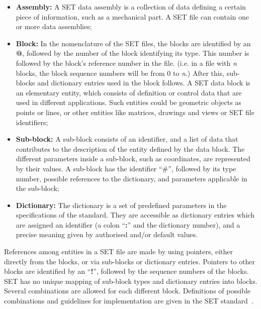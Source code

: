 \begin{itemize}
\item{\bf Assembly:} A SET data assembly is a collection of data defining
a certain piece of information, such as a mechanical part.
A SET file can contain one or more data assemblies;
 
\item{\bf Block:} In the nomenclature of the SET files,
the blocks are identified by an {\bf @},
followed by the number of the block identifying its type.
This number is followed by the block's reference number in the file.
(i.e. in a file with {\it n} blocks, the block sequence numbers will be from 0
 to {\it n}.)
After this, sub-blocks and dictionary entries used in the block follows.
A SET data block is an elementary entity, which consists of
definition or control data that are used in different applications.
Such entities could be geometric objects as points or lines, or other entities
like matrices, drawings and views or SET file identifiers;
 
 
\item{\bf Sub-block:} A sub-block consists of an identifier, and a list of data
that contributes to the description of the entity defined by the data block.
The different parameters inside a sub-block, such as coordinates, are
represented by their values. A sub-block has the identifier ``\#'', followed by
 its
type number, possible references to the dictionary, and parameters applicable in
the sub-block;
 
\item{\bf Dictionary:} The dictionary is a set of predefined parameters in the
specifications of the standard. They are accessible as dictionary entries which
are assigned an identifier (a colon ``{\bf :}'' and the dictionary number), and
 a
precise meaning given by authorised and/or default values.
 
\end{itemize}
 
References among entities in a SET file are made by using pointers,
either directly
from the blocks, or via sub-blocks or dictionary entries.  Pointers
to other blocks are identified by an ``{\bf !}'', followed by the sequence
numbers of the blocks.
SET has no unique mapping of  sub-block types and dictionary
entries into blocks. Several combinations are allowed for each different
block.  Definitions of possible combinations and guidelines for implementation
are given in the SET standard~\cite{set}.
 
 
 
